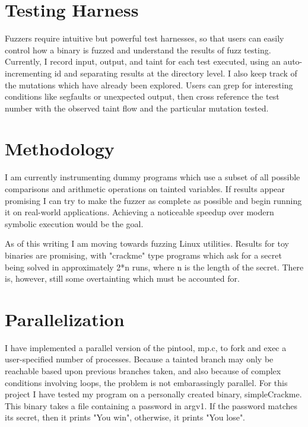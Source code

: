\documentclass[11pt,expanded,copyright]{fsuthesis}
\begin{document}
\section{Testing Harness}

Fuzzers require intuitive but powerful test harnesses, so that users can easily control how a binary is fuzzed and understand the results of fuzz testing. Currently, I record input, output, and taint for each test executed, using an auto-incrementing id and separating results at the directory level. I also keep track of the mutations which have already been explored. Users can grep for interesting conditions like segfaults or unexpected output, then cross reference the test number with the observed taint flow and the particular mutation tested.


\section{Methodology}

I am currently instrumenting dummy programs which use a subset of all possible comparisons and arithmetic operations on tainted variables. If results appear promising I can try to make the fuzzer as complete as possible and begin running it on real-world applications. Achieving a noticeable speedup over modern symbolic execution would be the goal.

As of this writing I am moving towards fuzzing Linux utilities. Results for toy binaries are promising, with "crackme" type programs which ask for a secret being solved in approximately 2*n runs, where n is the length of the secret. There is, however, still some overtainting which must be accounted for.	

\section{Parallelization}

I have implemented a parallel version of the pintool, mp.c, to fork and exec a user-specified number of processes. Because a tainted branch may only be reachable based upon previous branches taken, and also because of complex conditions involving loops, the problem is not embarassingly parallel. For this project I have tested my program on a personally created binary, simpleCrackme. This binary takes a file containing a password in argv1. If the password matches its secret, then it prints "You win", otherwise, it prints "You lose". 
\end{document}
